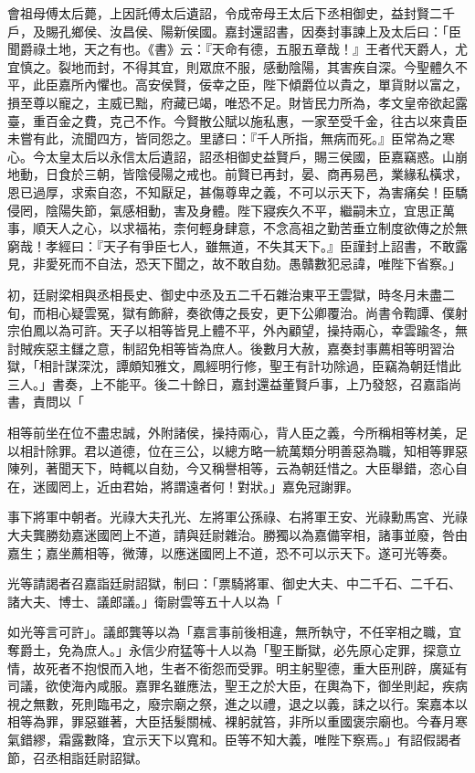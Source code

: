 \begin{pinyinscope}
會祖母傅太后薨，上因託傅太后遺詔，令成帝母王太后下丞相御史，益封賢二千戶，及賜孔鄉侯、汝昌侯、陽新侯國。嘉封還詔書，因奏封事諫上及太后曰：「臣聞爵祿土地，天之有也。《書》云：『天命有德，五服五章哉！』王者代天爵人，尤宜慎之。裂地而封，不得其宜，則眾庶不服，感動陰陽，其害疾自深。今聖體久不平，此臣嘉所內懼也。高安侯賢，佞幸之臣，陛下傾爵位以貴之，單貨財以富之，損至尊以寵之，主威已黜，府藏已竭，唯恐不足。財皆民力所為，孝文皇帝欲起露臺，重百金之費，克己不作。今賢散公賦以施私惠，一家至受千金，往古以來貴臣未嘗有此，流聞四方，皆同怨之。里諺曰：『千人所指，無病而死。』臣常為之寒心。今太皇太后以永信太后遺詔，詔丞相御史益賢戶，賜三侯國，臣嘉竊惑。山崩地動，日食於三朝，皆陰侵陽之戒也。前賢已再封，晏、商再易邑，業緣私橫求，恩已過厚，求索自恣，不知厭足，甚傷尊卑之義，不可以示天下，為害痛矣！臣驕侵罔，陰陽失節，氣感相動，害及身體。陛下寢疾久不平，繼嗣未立，宜思正萬事，順天人之心，以求福祐，柰何輕身肆意，不念高祖之勤苦垂立制度欲傳之於無窮哉！孝經曰：『天子有爭臣七人，雖無道，不失其天下。』臣謹封上詔書，不敢露見，非愛死而不自法，恐天下聞之，故不敢自劾。愚贛數犯忌諱，唯陛下省察。」

初，廷尉梁相與丞相長史、御史中丞及五二千石雜治東平王雲獄，時冬月未盡二旬，而相心疑雲冤，獄有飾辭，奏欲傳之長安，更下公卿覆治。尚書令鞫譚、僕射宗伯鳳以為可許。天子以相等皆見上體不平，外內顧望，操持兩心，幸雲踰冬，無討賊疾惡主讎之意，制詔免相等皆為庶人。後數月大赦，嘉奏封事薦相等明習治獄，「相計謀深沈，譚頗知雅文，鳳經明行修，聖王有計功除過，臣竊為朝廷惜此三人。」書奏，上不能平。後二十餘日，嘉封還益董賢戶事，上乃發怒，召嘉詣尚書，責問以「

相等前坐在位不盡忠誠，外附諸侯，操持兩心，背人臣之義，今所稱相等材美，足以相計除罪。君以道德，位在三公，以總方略一統萬類分明善惡為職，知相等罪惡陳列，著聞天下，時輒以自劾，今又稱譽相等，云為朝廷惜之。大臣舉錯，恣心自在，迷國罔上，近由君始，將謂遠者何！對狀。」嘉免冠謝罪。

事下將軍中朝者。光祿大夫孔光、左將軍公孫祿、右將軍王安、光祿勳馬宮、光祿大夫龔勝劾嘉迷國罔上不道，請與廷尉雜治。勝獨以為嘉備宰相，諸事並廢，咎由嘉生；嘉坐薦相等，微薄，以應迷國罔上不道，恐不可以示天下。遂可光等奏。

光等請謁者召嘉詣廷尉詔獄，制曰：「票騎將軍、御史大夫、中二千石、二千石、諸大夫、博士、議郎議。」衛尉雲等五十人以為「

如光等言可許」。議郎龔等以為「嘉言事前後相違，無所執守，不任宰相之職，宜奪爵土，免為庶人。」永信少府猛等十人以為「聖王斷獄，必先原心定罪，探意立情，故死者不抱恨而入地，生者不銜怨而受罪。明主躬聖德，重大臣刑辟，廣延有司議，欲使海內咸服。嘉罪名雖應法，聖王之於大臣，在輿為下，御坐則起，疾病視之無數，死則臨弔之，廢宗廟之祭，進之以禮，退之以義，誄之以行。案嘉本以相等為罪，罪惡雖著，大臣括髮關械、裸躬就笞，非所以重國褒宗廟也。今春月寒氣錯繆，霜露數降，宜示天下以寬和。臣等不知大義，唯陛下察焉。」有詔假謁者節，召丞相詣廷尉詔獄。


\end{pinyinscope}
